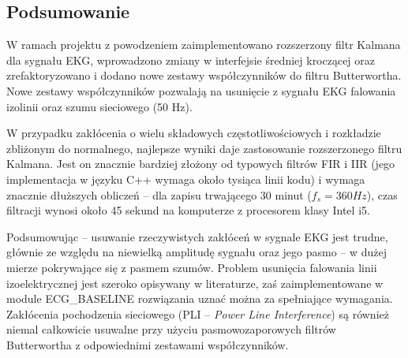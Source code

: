 \subsection{Podsumowanie}
W ramach projektu z powodzeniem zaimplementowano rozszerzony filtr Kalmana dla sygnału EKG, wprowadzono zmiany w interfejsie średniej kroczącej oraz zrefaktoryzowano i dodano nowe zestawy współczynników do filtru Butterwortha. Nowe zestawy współczynników pozwalają na usunięcie z sygnału EKG falowania izolinii oraz szumu sieciowego (50 Hz). 

W przypadku zakłócenia o wielu składowych częstotliwościowych i rozkładzie zbliżonym do normalnego, najlepsze wyniki daje zastosowanie rozszerzonego filtru Kalmana. Jest on znacznie bardziej złożony od typowych filtrów FIR i IIR (jego implementacja w języku C++ wymaga około tysiąca linii kodu) i wymaga znacznie dłuższych obliczeń -- dla zapisu trwającego 30 minut ($f_s = 360 Hz$), czas filtracji wynosi około 45 sekund na komputerze z procesorem klasy Intel i5.

Podsumowując -- usuwanie rzeczywistych zakłóceń w sygnale EKG jest trudne, głównie ze względu na niewielką amplitudę sygnału oraz jego pasmo -- w dużej mierze pokrywające się z pasmem szumów. Problem usunięcia falowania linii izoelektrycznej jest szeroko opisywany w literaturze, zaś zaimplementowane w module ECG\_BASELINE rozwiązania uznać można za spełniające wymagania. Zakłócenia pochodzenia sieciowego (PLI -- \emph{Power Line Interference}) są również niemal całkowicie usuwalne przy użyciu pasmowozaporowych filtrów Butterwortha z odpowiednimi zestawami współczynników. 
